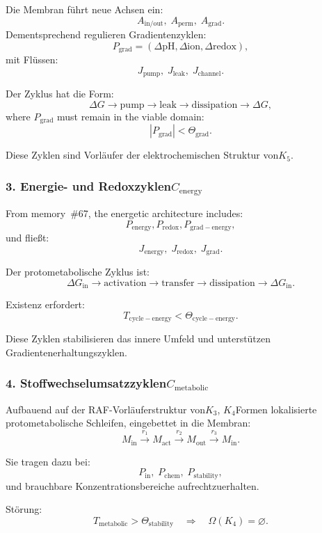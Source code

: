 Die Membran führt neue Achsen ein:
\[
  A_{\mathrm{in/out}},\;
  A_{\mathrm{perm}},\;
  A_{\mathrm{grad}}.
\]
Dementsprechend regulieren Gradientenzyklen:
\[
  P_{\mathrm{grad}}=
    (\Delta \mathrm{pH}, \Delta \mathrm{ion}, \Delta \mathrm{redox}),
\]
mit Flüssen:
\[
  J_{\mathrm{pump}},\;
  J_{\mathrm{leak}},\;
  J_{\mathrm{channel}}.
\]

Der Zyklus hat die Form:
\[
  \Delta G \to \mathrm{pump} \to
  \mathrm{leak} \to \mathrm{dissipation} \to
  \Delta G,
\]
where $P_{\mathrm{grad}}$ must remain in the viable domain:
\[
  |P_{\mathrm{grad}}| < \Theta_{\mathrm{grad}}.
\]

Diese Zyklen sind Vorläufer der elektrochemischen Struktur von$K_5$.

\subsubsection{3. Energie- und Redoxzyklen$C_{\mathrm{energy}}$}

From memory~\#67, the energetic architecture includes:
\[
  P_{\mathrm{energy}},
  P_{\mathrm{redox}},
  P_{\mathrm{grad-energy}},
\]
und fließt:
\[
  J_{\mathrm{energy}},\;
  J_{\mathrm{redox}},\;
  J_{\mathrm{grad}}.
\]

Der protometabolische Zyklus ist:
\[
  \Delta G_{\mathrm{in}} \to 
  \mathrm{activation} \to
  \mathrm{transfer} \to 
  \mathrm{dissipation} \to 
  \Delta G_{\mathrm{in}}.
\]

Existenz erfordert:
\[
  T_{\mathrm{cycle-energy}} < \Theta_{\mathrm{cycle-energy}}.
\]

Diese Zyklen stabilisieren das innere Umfeld und unterstützen
Gradientenerhaltungszyklen.

\subsubsection{4. Stoffwechselumsatzzyklen$C_{\mathrm{metabolic}}$}

Aufbauend auf der RAF-Vorläuferstruktur von$K_3$, $K_4$Formen
lokalisierte protometabolische Schleifen, eingebettet in die Membran:
\[
  M_{\mathrm{in}} \xrightarrow{r_1}
  M_{\mathrm{act}} \xrightarrow{r_2}
  M_{\mathrm{out}} \xrightarrow{r_3}
  M_{\mathrm{in}}.
\]

Sie tragen dazu bei:
\[
  P_{\mathrm{in}},\; P_{\mathrm{chem}},\; P_{\mathrm{stability}},
\]
und brauchbare Konzentrationsbereiche aufrechtzuerhalten.

Störung:
\[
  T_{\mathrm{metabolic}}>\Theta_{\mathrm{stability}}
\quad\Rightarrow\quad
  \Omega(K_4)=\varnothing.
\]

